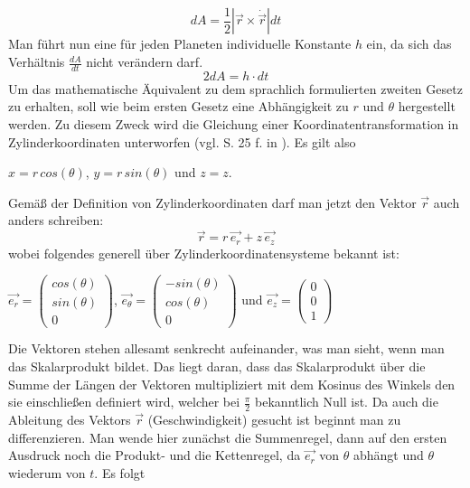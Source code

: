 \begin{equation}
dA = \frac{1}{2}\left| \vec{r} \times \dot{\vec{r}} \right|d t 
\label{equation_dA_kepler}
\end{equation}  
Man führt nun eine für jeden Planeten individuelle Konstante \ensuremath{h} ein, da sich das Verhältnis \ensuremath{\frac{dA}{dt}} nicht verändern darf. 
\begin{equation}
2 dA = h \cdot dt 
\end{equation}  
Um das mathematische Äquivalent zu dem sprachlich formulierten zweiten Gesetz zu erhalten, soll wie beim ersten Gesetz eine Abhängigkeit zu \ensuremath{r} und \ensuremath{\theta} hergestellt werden. Zu diesem Zweck wird die Gleichung einer Koordinatentransformation in Zylinderkoordinaten unterworfen (vgl. S. 25 f. in \cite{Raumflugm}). Es gilt also 
\begin{center}
	\ensuremath{x= r\, cos (\theta)}, \ensuremath{y=r\, sin (\theta)} und \ensuremath{z=z}. 
\end{center}
Gemäß der Definition von Zylinderkoordinaten darf man jetzt den Vektor \ensuremath{\vec{r}} auch anders schreiben:
\begin{equation}
	\vec{r} = r\,\vec{e_{r}} + z\,\vec{e_z}
\end{equation}
wobei folgendes generell über Zylinderkoordinatensysteme bekannt ist:
\begin{center}
	\ensuremath{\vec{e_{r}}=\left(\begin{array}{c}cos(\theta)\\ sin(\theta)\\0\end{array}\right)}, \ensuremath{\vec{e_{\theta}}=\left(\begin{array}{c}-sin(\theta)\\ cos(\theta)\\0\end{array}\right)}  und \ensuremath{\vec{e_z}=\left(\begin{array}{c}0\\0\\1\end{array}\right)}
\end{center}
Die Vektoren stehen allesamt senkrecht aufeinander, was man sieht, wenn man das Skalarprodukt bildet. Das liegt daran, dass das Skalarprodukt über die Summe der Längen der Vektoren multipliziert mit dem Kosinus des Winkels den sie einschließen definiert wird, welcher bei \ensuremath{\frac{\pi}{2}} bekanntlich Null ist. Da auch die Ableitung des Vektors \ensuremath{\vec{r}} (Geschwindigkeit) gesucht ist beginnt man zu differenzieren. Man wende hier zunächst die Summenregel, dann auf den ersten Ausdruck noch die Produkt- und die Kettenregel, da \ensuremath{\vec{e_{r}}} von \ensuremath{\theta} abhängt und \ensuremath{\theta} wiederum von \ensuremath{t}. Es folgt
